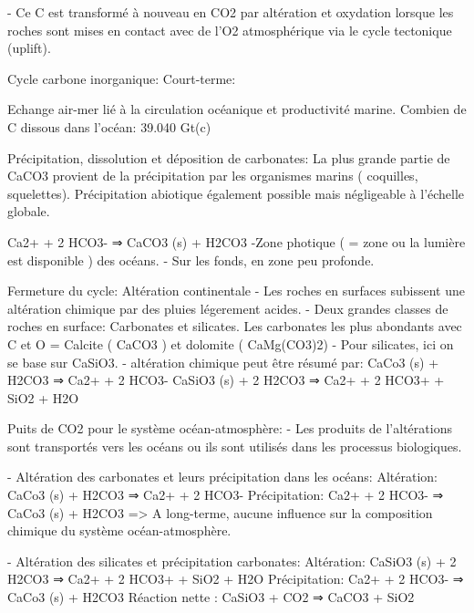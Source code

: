 - Ce C est transformé à nouveau en CO2 par altération et oxydation lorsque les roches sont mises en contact avec de l’O2 atmosphérique via le cycle tectonique (uplift).


  







Cycle carbone inorganique:
Court-terme:


Echange air-mer lié à la circulation océanique et productivité marine.
Combien de C dissous dans l’océan: 39.040 Gt(c)




Précipitation, dissolution et déposition de carbonates:
La plus grande partie de CaCO3 provient de la précipitation par les organismes marins ( coquilles, squelettes).
Précipitation abiotique également possible mais négligeable à l’échelle globale.


Ca2+ + 2 HCO3- ⇒ CaCO3 (s) + H2CO3 
-Zone photique ( = zone ou la lumière est disponible ) des océans.
- Sur les fonds, en zone peu profonde.


  





Fermeture du cycle: Altération continentale
- Les roches  en surfaces subissent une altération chimique par des pluies légerement acides.
- Deux grandes classes de roches en surface: Carbonates et silicates. Les carbonates les plus abondants avec C et O = Calcite ( CaCO3 ) et dolomite ( CaMg(CO3)2)
- Pour silicates, ici on se base sur CaSiO3.
- altération chimique peut être résumé par:
        CaCo3 (s) + H2CO3 ⇒ Ca2+ + 2 HCO3- 
        CaSiO3 (s) + 2 H2CO3 ⇒ Ca2+ + 2 HCO3+ + SiO2 + H2O


Puits de CO2 pour le système océan-atmosphère:
- Les produits de l’altérations sont transportés vers les océans ou ils sont utilisés dans les processus biologiques.


- Altération des carbonates et leurs précipitation dans les océans:
        Altération: CaCo3 (s) + H2CO3 ⇒ Ca2+ + 2 HCO3- 
        Précipitation: Ca2+ + 2 HCO3- ⇒ CaCo3 (s) + H2CO3 
=> A long-terme, aucune influence sur la composition chimique du système 
océan-atmosphère.


- Altération des silicates et précipitation carbonates:
        Altération: CaSiO3 (s) + 2 H2CO3 ⇒ Ca2+ + 2 HCO3+ + SiO2 + H2O
        Précipitation: Ca2+ + 2 HCO3- ⇒ CaCo3 (s) + H2CO3 
        Réaction nette : CaSiO3 + CO2 ⇒ CaCO3 + SiO2 


